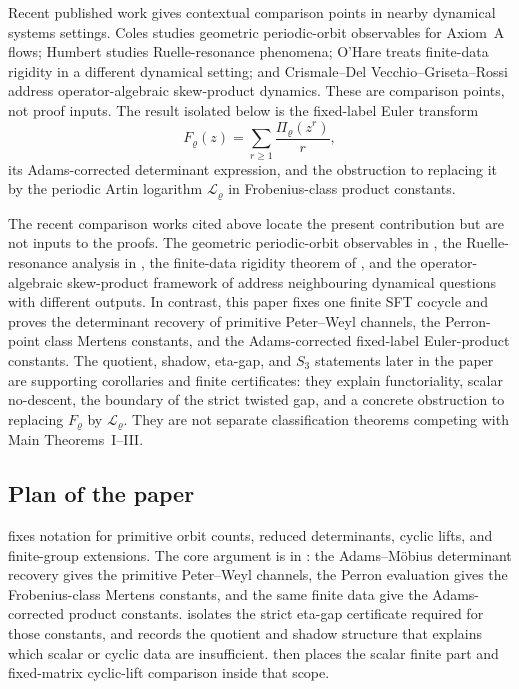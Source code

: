 Recent published work gives contextual comparison points in nearby
dynamical systems settings.  Coles \cite{Coles2025VassilievWritheAxiomA} studies geometric
periodic-orbit observables for Axiom~A flows; Humbert
\cite{Humbert2025FirstRuelleResonance} studies Ruelle-resonance phenomena;
O'Hare \cite{OHare2025FiniteDataRigidity} treats finite-data rigidity in
a different dynamical setting; and Crismale--Del Vecchio--Griseta--Rossi
\cite{CrismaleDelVecchioGrisetaRossi2025NoncommutativeSkewProduct}
address operator-algebraic skew-product dynamics.  These are comparison
points, not proof inputs.  The result isolated below is the fixed-label
Euler transform
\[
  F_\varrho(z)=\sum_{r\ge1}\frac{\Pi_\varrho(z^r)}{r},
\]
its Adams-corrected determinant expression, and the obstruction to
replacing it by the periodic Artin logarithm
\(\mathcal L_\varrho\) in Frobenius-class product constants.

The recent comparison works cited above locate the present contribution but
are not inputs to the proofs.  The geometric periodic-orbit observables in
\cite{Coles2025VassilievWritheAxiomA}, the Ruelle-resonance analysis in
\cite{Humbert2025FirstRuelleResonance}, the finite-data rigidity theorem of
\cite{OHare2025FiniteDataRigidity}, and the operator-algebraic skew-product
framework of
\cite{CrismaleDelVecchioGrisetaRossi2025NoncommutativeSkewProduct} address
neighbouring dynamical questions with different outputs.  In contrast, this
paper fixes one finite SFT cocycle and proves the determinant recovery of
primitive Peter--Weyl channels, the Perron-point class Mertens constants, and
the Adams-corrected fixed-label Euler-product constants.  The quotient,
shadow, eta-gap, and \(S_3\) statements later in the paper are supporting
corollaries and finite certificates: they explain functoriality, scalar
no-descent, the boundary of the strict twisted gap, and a concrete obstruction
to replacing \(F_\varrho\) by \(\mathcal L_\varrho\).  They are not separate
classification theorems competing with Main Theorems~I--III.
\subsection{Plan of the paper}

 fixes notation for primitive orbit counts,
reduced determinants, cyclic lifts, and finite-group extensions.  The core
argument is in : the Adams--M\"obius determinant
recovery gives the primitive Peter--Weyl channels, the Perron evaluation
gives the Frobenius-class Mertens constants, and the same finite data give
the Adams-corrected product constants.   isolates the
strict eta-gap certificate required for those constants, and
 records the quotient and shadow structure that explains
which scalar or cyclic data are insufficient.  
then places the scalar finite part and fixed-matrix cyclic-lift comparison
inside that scope.

